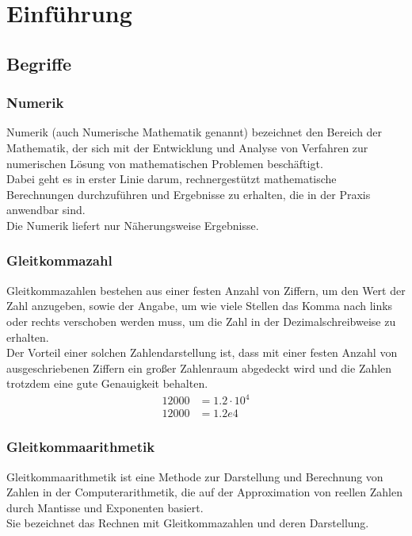 \section {Einführung}
\subsection{Begriffe}

\subsubsection{Numerik}
Numerik (auch Numerische Mathematik genannt) bezeichnet den Bereich der Mathematik, der sich mit der Entwicklung und Analyse von Verfahren zur numerischen Lösung von mathematischen Problemen beschäftigt. \\
Dabei geht es in erster Linie darum, rechnergestützt mathematische Berechnungen durchzuführen und Ergebnisse zu erhalten, die in der Praxis anwendbar sind. \\
Die Numerik liefert nur Näherungsweise Ergebnisse.

\subsubsection{Gleitkommazahl}
Gleitkommazahlen bestehen aus einer festen Anzahl von Ziffern, um den Wert der Zahl anzugeben, sowie der Angabe, um wie viele Stellen das Komma nach links oder rechts verschoben werden muss, um die Zahl in der Dezimalschreibweise zu erhalten. \\
Der Vorteil einer solchen Zahlendarstellung ist, dass mit einer festen Anzahl von ausgeschriebenen Ziffern ein großer Zahlenraum abgedeckt wird und die Zahlen trotzdem eine gute Genauigkeit behalten.\\

\begin{align*}
	12000  &=  1.2\cdot10^4 \\
	12000 &=  1.2e4
\end{align*}

\subsubsection{Gleitkommaarithmetik} 
Gleitkommaarithmetik ist eine Methode zur Darstellung und Berechnung von Zahlen in der Computerarithmetik, die auf der Approximation von reellen Zahlen durch Mantisse und Exponenten basiert. \\
Sie bezeichnet das Rechnen mit Gleitkommazahlen und deren Darstellung.
